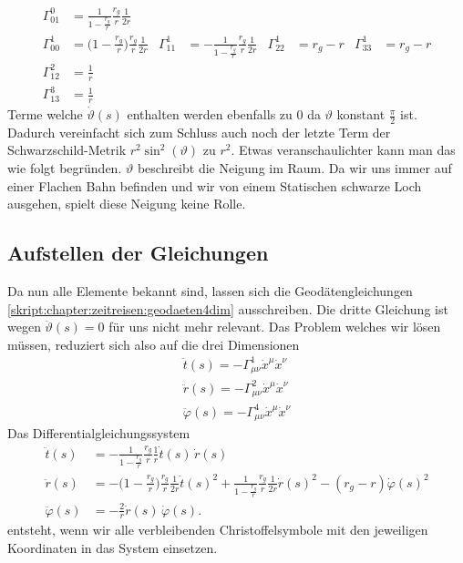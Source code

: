 \begin{refsection}
	\begin{align*}
	\Gamma^0_{01}
	&=
	\frac{1}{1-\displaystyle\frac{r_g}{r}}
	\frac{r_g}{r}
	\frac{1}{2r}
	\\
	\Gamma^1_{00}
	&=
	\biggl(1-\displaystyle\frac{r_g}{r}\biggr)
	\frac{r_g}{r}
	\frac{1}{2r}
	&
	\Gamma^1_{11}
	&=
	-\frac1{1-\displaystyle\frac{r_g}{r}}
	\frac{r_g}{r}
	\frac{1}{2r}
	&
	\Gamma^1_{22}
	&=
	r_g-r
	&
	\Gamma^1_{33}
	&=
	r_g-r
	\\
	\Gamma^2_{12}
	&=
	\frac1r
	\\
	\Gamma^3_{13}
	&=
	\frac1r
	\end{align*}
	Terme welche $\dot{\vartheta}(s)$ enthalten werden ebenfalls zu $0$ da $\vartheta$ konstant $\frac{\pi}{2}$ ist. Dadurch vereinfacht sich zum Schluss auch noch der letzte Term der Schwarzschild-Metrik $r^{2}\sin^{2}(\vartheta)$ zu $r^2$. Etwas veranschaulichter kann man das wie folgt begründen. $\vartheta$ beschreibt die Neigung im Raum. Da wir uns immer auf einer Flachen Bahn befinden und wir von einem Statischen schwarze Loch ausgehen, spielt diese Neigung keine Rolle.
	
	
	\subsection{Aufstellen der Gleichungen}
	
	Da nun alle Elemente bekannt sind, lassen sich die Geodätengleichungen \ref{skript:chapter:zeitreisen:geodaeten4dim} ausschreiben. Die dritte Gleichung ist wegen $\ddot{\vartheta}(s)=0$ für uns nicht mehr relevant. Das Problem welches wir lösen müssen, reduziert sich also auf die drei Dimensionen
	\begin{align*}
	\ddot{t}(s) = -\Gamma^{1}_{\mu\nu}\dot{x}^{\mu}\dot{x}^{\nu}\\
	\ddot{r}(s) = -\Gamma^{2}_{\mu\nu}\dot{x}^{\mu}\dot{x}^{\nu}\\
	\ddot{\varphi}(s) = -\Gamma^{4}_{\mu\nu}\dot{x}^{\mu}\dot{x}^{\nu}		
	\end{align*} 
	Das Differentialgleichungssystem
	\begin{equation}\label{finaleq}
	\begin{aligned}
	\ddot t(s)
	&=
	-\frac{1}{1-\displaystyle\frac{r_g}{r}}\frac{r_g}{r}\frac{1}{r}\dot t(s)\,\dot r(s)
	\\
	\ddot r(s)
	&=
	-\biggl(1-\frac{r_g}{r}\biggr)\frac{r_g}{r}\frac1{2r}\dot t(s)^2
	+\frac{1}{1-\displaystyle\frac{r_g}{r}} \frac{r_g}{r}\frac1{2r}\dot r(s)^2
	- (r_g-r) \dot\varphi(s)^2
	\\
	\ddot \varphi(s)
	&=
	-\frac2r \dot r(s)\,\dot\varphi(s).
	\end{aligned}
	\end{equation}
	entsteht, wenn wir alle verbleibenden Christoffelsymbole mit den jeweiligen Koordinaten in das System einsetzen.
	

\end{refsection}
